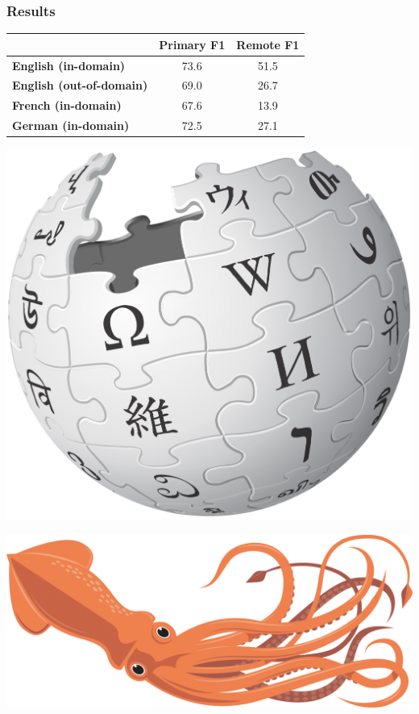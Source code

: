 \documentclass[t,handout,xcolor={svgnames}]{beamer}
\begin{document}
\begin{frame}
\frametitle{Results}
\centering
\small
\setlength\tabcolsep{3pt}
\begin{tabular}{lcc}
& \footnotesize \bf Primary F1 & \footnotesize \bf Remote F1 \\
\hline
\small \bf English (in-domain)     & 73.6 & 51.5 \\
\small \bf English (out-of-domain) & 69.0 & 26.7 \\
\small \bf French (in-domain)      & 67.6 & 13.9 \\
\small \bf German (in-domain)      & 72.5 & 27.1
\end{tabular}
\vfill

\begin{center}
  \begin{minipage}{.3\textwidth}\includegraphics[width=\textwidth]{wikipedia.png}\end{minipage}
  \begin{minipage}{.3\textwidth}\includegraphics[width=\textwidth]{squid.jpg}\end{minipage}
\end{center}
\end{frame}
\end{document}
